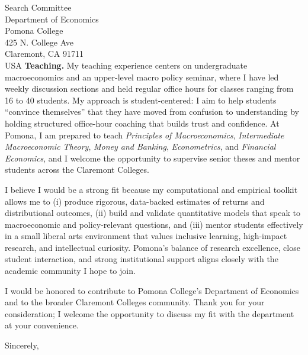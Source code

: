 \documentclass[11pt,letterpaper]{letter}
\begin{document}
\begin{letter}{Search Committee \\
Department of Economics \\
Pomona College \\
425 N. College Ave \\
Claremont, CA 91711 \\ USA}
\textbf{Teaching.} My teaching experience centers on undergraduate macroeconomics and an upper-level macro policy seminar, where I have led weekly discussion sections and held regular office hours for classes ranging from 16 to 40 students. My approach is student-centered: I aim to help students “convince themselves” that they have moved from confusion to understanding by holding structured office-hour coaching that builds trust and confidence. At Pomona, I am prepared to teach \textit{Principles of Macroeconomics}, \textit{Intermediate Macroeconomic Theory}, \textit{Money and Banking}, \textit{Econometrics}, and \textit{Financial Economics}, and I welcome the opportunity to supervise senior theses and mentor students across the Claremont Colleges.

I believe I would be a strong fit because my computational and empirical toolkit allows me to (i) produce rigorous, data-backed estimates of returns and distributional outcomes, (ii) build and validate quantitative models that speak to macroeconomic and policy-relevant questions, and (iii) mentor students effectively in a small liberal arts environment that values inclusive learning, high-impact research, and intellectual curiosity. Pomona’s balance of research excellence, close student interaction, and strong institutional support aligns closely with the academic community I hope to join.

I would be honored to contribute to Pomona College’s Department of Economics and to the broader Claremont Colleges community. Thank you for your consideration; I welcome the opportunity to discuss my fit with the department at your convenience.

\closing{Sincerely,}

\end{letter}
\end{document}
